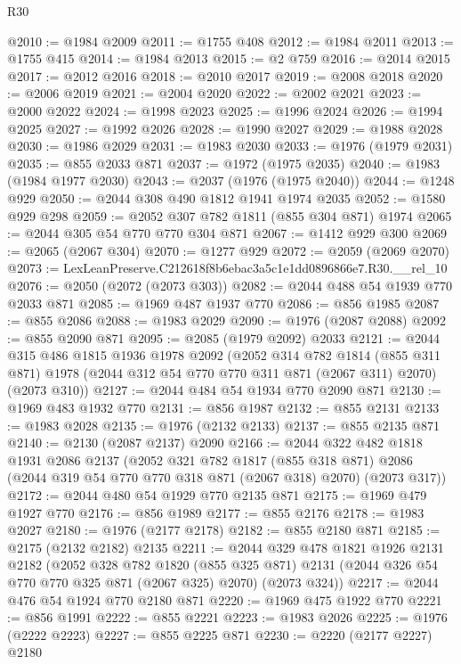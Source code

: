 \begin{lexlean}{R30}
\begin{coremodule}
@2010 := @1984 @2009
@2011 := @1755 @408
@2012 := @1984 @2011
@2013 := @1755 @415
@2014 := @1984 @2013
@2015 := @2 @759
@2016 := @2014 @2015
@2017 := @2012 @2016
@2018 := @2010 @2017
@2019 := @2008 @2018
@2020 := @2006 @2019
@2021 := @2004 @2020
@2022 := @2002 @2021
@2023 := @2000 @2022
@2024 := @1998 @2023
@2025 := @1996 @2024
@2026 := @1994 @2025
@2027 := @1992 @2026
@2028 := @1990 @2027
@2029 := @1988 @2028
@2030 := @1986 @2029
@2031 := @1983 @2030
@2033 := @1976 (@1979 @2031)
@2035 := @855 @2033 @871
@2037 := @1972 (@1975 @2035)
@2040 := @1983 (@1984 @1977 @2030)
@2043 := @2037 (@1976 (@1975 @2040))
@2044 := @1248 @929
@2050 := @2044 @308 @490 @1812 @1941 @1974 @2035
@2052 := @1580 @929 @298
@2059 := @2052 @307 @782 @1811 (@855 @304 @871) @1974
@2065 := @2044 @305 @54 @770 @770 @304 @871
@2067 := @1412 @929 @300
@2069 := @2065 (@2067 @304)
@2070 := @1277 @929
@2072 := @2059 (@2069 @2070)
@2073 := LexLeanPreserve.C212618f8b6ebac3a5c1e1dd0896866e7.R30.__rel_10
@2076 := @2050 (@2072 (@2073 @303))
@2082 := @2044 @488 @54 @1939 @770 @2033 @871
@2085 := @1969 @487 @1937 @770
@2086 := @856 @1985
@2087 := @855 @2086
@2088 := @1983 @2029
@2090 := @1976 (@2087 @2088)
@2092 := @855 @2090 @871
@2095 := @2085 (@1979 @2092) @2033
@2121 := @2044
    @315
    @486
    @1815
    @1936
    @1978
    @2092
    (@2052
      @314
      @782
      @1814
      (@855 @311 @871)
      @1978
      (@2044 @312 @54 @770 @770 @311 @871 (@2067 @311) @2070)
      (@2073 @310))
@2127 := @2044 @484 @54 @1934 @770 @2090 @871
@2130 := @1969 @483 @1932 @770
@2131 := @856 @1987
@2132 := @855 @2131
@2133 := @1983 @2028
@2135 := @1976 (@2132 @2133)
@2137 := @855 @2135 @871
@2140 := @2130 (@2087 @2137) @2090
@2166 := @2044
    @322
    @482
    @1818
    @1931
    @2086
    @2137
    (@2052
      @321
      @782
      @1817
      (@855 @318 @871)
      @2086
      (@2044 @319 @54 @770 @770 @318 @871 (@2067 @318) @2070)
      (@2073 @317))
@2172 := @2044 @480 @54 @1929 @770 @2135 @871
@2175 := @1969 @479 @1927 @770
@2176 := @856 @1989
@2177 := @855 @2176
@2178 := @1983 @2027
@2180 := @1976 (@2177 @2178)
@2182 := @855 @2180 @871
@2185 := @2175 (@2132 @2182) @2135
@2211 := @2044
    @329
    @478
    @1821
    @1926
    @2131
    @2182
    (@2052
      @328
      @782
      @1820
      (@855 @325 @871)
      @2131
      (@2044 @326 @54 @770 @770 @325 @871 (@2067 @325) @2070)
      (@2073 @324))
@2217 := @2044 @476 @54 @1924 @770 @2180 @871
@2220 := @1969 @475 @1922 @770
@2221 := @856 @1991
@2222 := @855 @2221
@2223 := @1983 @2026
@2225 := @1976 (@2222 @2223)
@2227 := @855 @2225 @871
@2230 := @2220 (@2177 @2227) @2180

\end{coremodule}
\end{lexlean}
